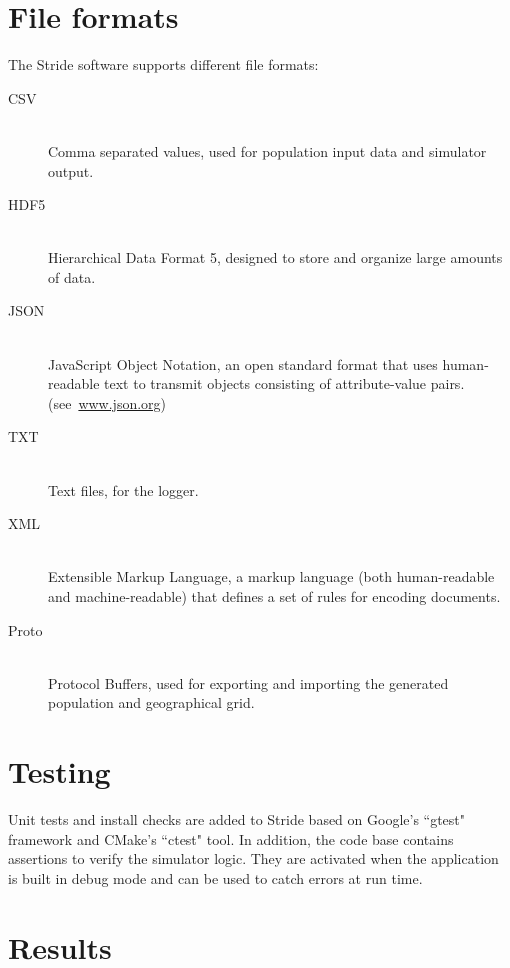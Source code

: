 \section{File formats}
\label{section:FileFormats}

The Stride software supports different file formats:
\begin{description}
	\item [CSV] \ \\
	Comma separated values, used for population input data and simulator output.
	\item [HDF5] \ \\
	Hierarchical Data Format 5, designed to store and organize large amounts of data.
	\item [JSON] \ \\
	JavaScript Object Notation, an open standard format that uses human-readable text to transmit objects consisting of attribute-value pairs. 	 \mbox{(see \url{www.json.org})}
	\item [TXT] \ \\
	Text files, for the logger.
	\item [XML] \ \\
	Extensible Markup Language, a markup language (both human-readable and machine-readable) that defines a set of rules for encoding documents.
    \item [Proto] \ \\
    Protocol Buffers, used for exporting and importing the generated population and geographical grid.
\end{description}


%
\section{Testing}
Unit tests and install checks are added to Stride based on Google's ``gtest" framework and CMake's ``ctest" tool.
In addition, the code base contains assertions to verify the simulator logic.
They are activated when the application is built in debug mode and can be used to catch errors at run time.


\section{Results}
\label{section:Results}

